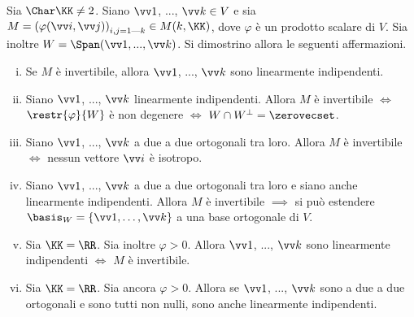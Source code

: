 \begin{exercise} Sia $\Char \KK \neq 2$.
	Siano $\vv1$, ..., $\vv k \in V$ e sia $M = \left( \varphi(\vv i, \vv j) \right)_{i, j = 1\textrm{---}k} \in M(k, \KK)$,
	dove $\varphi$ è un prodotto scalare di $V$. Sia inoltre $W = \Span(\vv 1, ..., \vv k)$. Si dimostrino
	allora le seguenti affermazioni.
	
	\begin{enumerate}[(i)]
		\item Se $M$ è invertibile, allora $\vv 1$, ..., $\vv k$ sono linearmente indipendenti.
		
		\item Siano $\vv 1$, ..., $\vv k$ linearmente indipendenti. Allora $M$ è invertibile $\iff$ $\restr{\varphi}{W}$ è non degenere $\iff$ $W \cap W^\perp = \zerovecset$.
		
		\item Siano $\vv1$, ..., $\vv k$ a due a due ortogonali tra loro. Allora $M$ è invertibile $\iff$ nessun
		vettore $\vv i$ è isotropo.
		
		\item Siano $\vv1$, ..., $\vv k$ a due a due ortogonali tra loro e siano anche linearmente indipendenti.
		Allora $M$ è invertibile $\implies$ si può estendere $\basis_W = \{\vv 1, \ldots, \vv k\}$ a una base ortogonale di $V$.
		
		\item Sia $\KK = \RR$. Sia inoltre $\varphi > 0$. Allora $\vv 1$, ..., $\vv k$ sono linearmente
		indipendenti $\iff$ $M$ è invertibile.
		
		\item Sia $\KK = \RR$. Sia ancora $\varphi > 0$. Allora se $\vv 1$, ..., $\vv k$ sono a due a due
		ortogonali e sono tutti non nulli, sono anche linearmente indipendenti.
	\end{enumerate}
\end{exercise}

